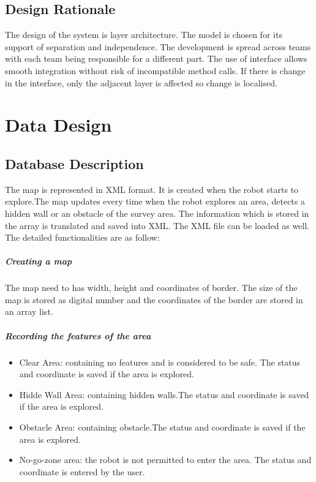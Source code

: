 \documentclass[11pt, a4paper]{report}
\begin{document}
\section{Design Rationale}
The design of the system is layer architecture. The model is chosen for its support of separation
and independence. The development is spread across teams with each team being responsible
for a different part. The use of interface allows smooth integration without risk of
 incompatible method calls. If there is change in the interface, only the adjacent layer is affected
 so change is localised.

\pagebreak


\chapter{Data Design}%
\label{cha:DD1}

\section{Database Description}
The map is represented in XML format. It is created when the robot starts to explore.The map updates every time when the robot explores an area, detects
a hidden wall or an obstacle of the survey area. The information which is stored in the array is translated
and saved into XML. The XML file can be loaded as well. The detailed functionalities are
as follow:

\paragraph{Creating a map}

The map need to has width, height and coordinates of border. The size of the map is stored as digital number and the coordinates of the border are stored in an array list.

\paragraph{Recording the features of the area}

\begin{itemize}
\item  Clear Area: containing no features and is considered to be safe. The status and coordinate is saved if the area is explored.
\item	Hidde Wall Area: containing hidden walls.The status and coordinate is saved if the area is explored.
\item  Obstacle Area: containing obstacle.The status and coordinate is saved if the area is explored.
\item  No-go-zone area: the robot is not permitted to enter the area. The status and coordinate is entered by the user.
\end{itemize}
\end{document}
